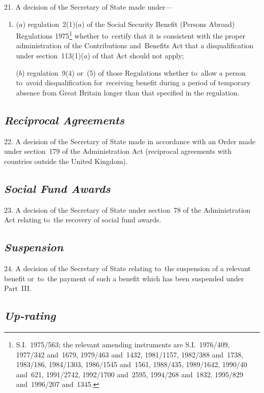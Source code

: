 \documentclass[12pt,a4paper]{article}
\begin{document}
21.  A decision of the Secretary of State made under—
\begin{enumerate}\item[]
($a$) regulation~2(1)($a$) of the Social Security Benefit (Persons Abroad) Regulations 1975\footnote{\frenchspacing S.I.~1975/563; the relevant amending instruments are S.I.~1976/409, 1977/342 and~1679, 1979/463 and~1432, 1981/1157, 1982/388 and~1738, 1983/186, 1984/1303, 1986/1545 and~1561, 1988/435, 1989/1642, 1990/40 and~621, 1991/2742, 1992/1700 and~2595, 1994/268 and~1832, 1995/829 and~1996/207 and~1345.} whether to~certify that it is consistent with the proper administration of the Contributions and~Benefits Act that a disqualification under section~113(1)($a$) of that Act should not apply;

($b$) regulation~9(4) or~(5) of those Regulations whether to~allow a person to~avoid disqualification for~receiving benefit during a period of temporary absence from Great Britain longer than that specified in the regulation.
\end{enumerate}

\subsection*{\itshape Reciprocal Agreements}

22.  A decision of the Secretary of State made in accordance with an Order made under section~179 of the Administration Act (reciprocal agreements with countries outside the United Kingdom).

\subsection*{\itshape Social Fund Awards}

23.  A decision of the Secretary of State under section~78 of the Administration Act relating to~the recovery of social fund awards.

\subsection*{\itshape Suspension}

24.  A decision of the Secretary of State relating to~the suspension of a relevant benefit or~to~the payment of such a benefit which has been suspended under Part~III.

\subsection*{\itshape Up-rating}
\end{document}
